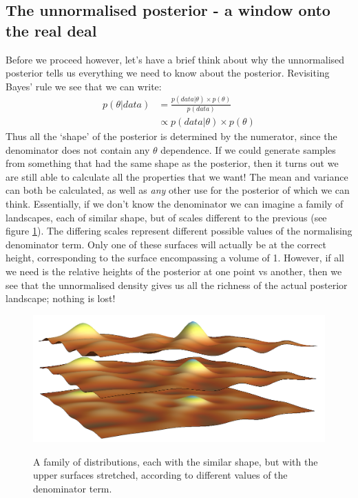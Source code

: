 \documentclass[11pt,fullpage]{book}
\begin{document}
\subsection{The unnormalised posterior - a window onto the real deal}\label{sec:MCMC_unnormalisedPosteriorSampling}
Before we proceed however, let's have a brief think about why the unnormalised posterior tells us everything we need to know about the posterior. Revisiting Bayes' rule we see that we can write:
%
\begin{equation}
\begin{align}
p(\theta|data) &= \frac{p(data|\theta)\times p(\theta)}{p(data)}\\
&\propto p(data|\theta)\times p(\theta)
\end{align}
\end{equation}
%
Thus all the `shape' of the posterior is determined by the numerator, since the denominator does not contain any $\theta$ dependence. If we could generate samples from something that had the same shape as the posterior, then it turns out we are still able to calculate all the properties that we want! The mean and variance can both be calculated, as well as \textit{any} other use for the posterior of which we can think. Essentially, if we don't know the denominator we can imagine a family of landscapes, each of similar shape, but of scales different to the previous (see figure \ref{fig:MCMC_familityOfDistributionsShape}). The differing scales represent different possible values of the normalising denominator term. Only one of these surfaces will actually be at the correct height, corresponding to the surface encompassing a volume of 1. However, if all we need is the relative heights of the posterior at one point vs another, then we see that the unnormalised density gives us all the richness of the actual posterior landscape; nothing is lost!

\begin{figure}
\centering
\scalebox{0.3} 
{\includegraphics{MCMC_familityOfDistributionsShape.png}}
\caption{A family of distributions, each with the similar shape, but with the upper surfaces stretched, according to different values of the denominator term.}\label{fig:MCMC_familityOfDistributionsShape}
\end{figure}
\end{document}
